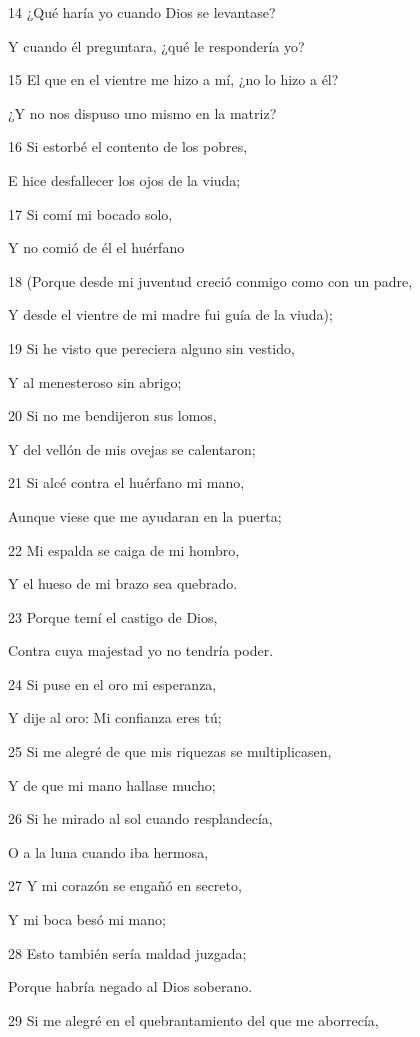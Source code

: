 \par 14 ¿Qué haría yo cuando Dios se levantase?
\par Y cuando él preguntara, ¿qué le respondería yo?
\par 15 El que en el vientre me hizo a mí, ¿no lo hizo a él?
\par ¿Y no nos dispuso uno mismo en la matriz?
\par 16 Si estorbé el contento de los pobres,
\par E hice desfallecer los ojos de la viuda;
\par 17 Si comí mi bocado solo,
\par Y no comió de él el huérfano
\par 18 (Porque desde mi juventud creció conmigo como con un padre,
\par Y desde el vientre de mi madre fui guía de la viuda);
\par 19 Si he visto que pereciera alguno sin vestido,
\par Y al menesteroso sin abrigo;
\par 20 Si no me bendijeron sus lomos,
\par Y del vellón de mis ovejas se calentaron;
\par 21 Si alcé contra el huérfano mi mano,
\par Aunque viese que me ayudaran en la puerta;
\par 22 Mi espalda se caiga de mi hombro,
\par Y el hueso de mi brazo sea quebrado.
\par 23 Porque temí el castigo de Dios,
\par Contra cuya majestad yo no tendría poder.
\par 24 Si puse en el oro mi esperanza,
\par Y dije al oro: Mi confianza eres tú;
\par 25 Si me alegré de que mis riquezas se multiplicasen,
\par Y de que mi mano hallase mucho;
\par 26 Si he mirado al sol cuando resplandecía,
\par O a la luna cuando iba hermosa,
\par 27 Y mi corazón se engañó en secreto,
\par Y mi boca besó mi mano;
\par 28 Esto también sería maldad juzgada;
\par Porque habría negado al Dios soberano.
\par 29 Si me alegré en el quebrantamiento del que me aborrecía,
